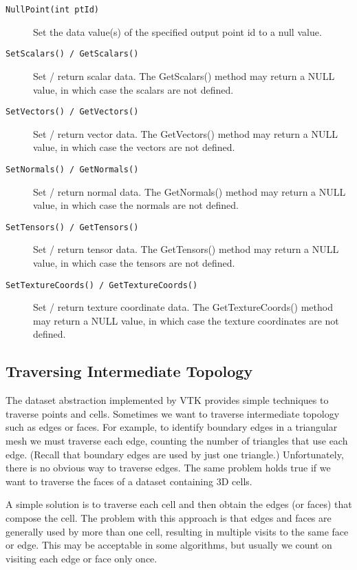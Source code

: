 \begin{description}[leftmargin=0cm,labelindent=0cm]
\begin{description}
    \item[\texttt{NullPoint(int ptId)}]
    Set the data value(s) of the specified output point id to a null value.

    \item[\texttt{SetScalars() / GetScalars()}]
    Set / return scalar data. The GetScalars() method may return a NULL value, in which case the scalars are not defined.

    \item[\texttt{SetVectors() / GetVectors()}]
    Set / return vector data. The GetVectors() method may return a NULL value, in which case the vectors are not defined.

    \item[\texttt{SetNormals() / GetNormals()}]
    Set / return normal data. The GetNormals() method may return a NULL value, in which case the normals are not defined.

    \item[\texttt{SetTensors() / GetTensors()}]
    Set / return tensor data. The GetTensors() method may return a NULL value, in which case the tensors are not defined.

    \item[\texttt{SetTextureCoords() / GetTextureCoords()}]
    Set / return texture coordinate data. The GetTextureCoords() method may return a NULL value, in which case the texture coordinates are not defined.

    \end{description}
\end{description}

\subsection{Traversing Intermediate Topology}

The dataset abstraction implemented by VTK provides simple techniques to traverse points and cells. Sometimes we want to traverse intermediate topology such as edges or faces. For example, to identify boundary edges in a triangular mesh we must traverse each edge, counting the number of triangles that use each edge. (Recall that boundary edges are used by just one triangle.) Unfortunately, there is no obvious way to traverse edges. The same problem holds true if we want to traverse the faces of a dataset containing 3D cells.

A simple solution is to traverse each cell and then obtain the edges (or faces) that compose the cell. The problem with this approach is that edges and faces are generally used by more than one cell, resulting in multiple visits to the same face or edge. This may be acceptable in some algorithms, but usually we count on visiting each edge or face only once.

